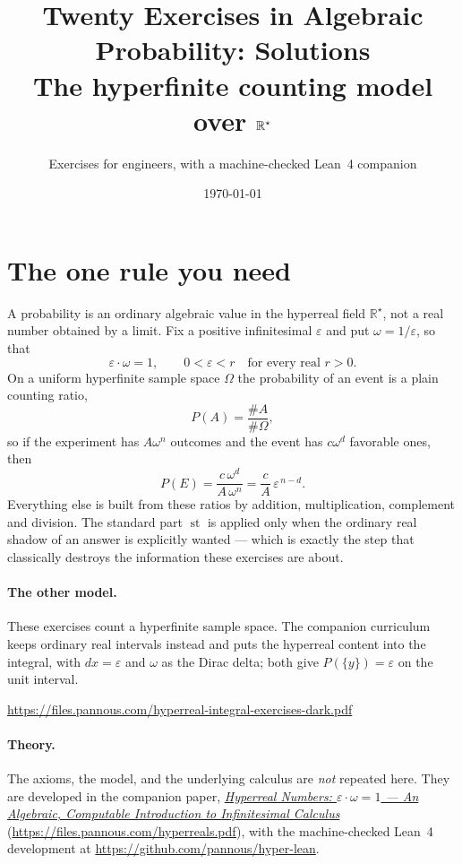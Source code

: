 \documentclass[11pt]{article}
\title{Twenty Exercises in Algebraic Probability: Solutions\\
\large The hyperfinite counting model over $\Rstar$}
\author{Exercises for engineers, with a machine-checked Lean~4 companion}
\date{\today}
\newcommand{\Rstar}{\mathbb{R}^{\star}}
\newcommand{\eps}{\varepsilon}
\newcommand{\st}{\operatorname{st}}
\begin{document}
\maketitle


\section*{The one rule you need}

A probability is an ordinary algebraic value in the hyperreal field $\Rstar$,
not a real number obtained by a limit. Fix a positive infinitesimal $\eps$ and
put $\omega = 1/\eps$, so that
\[
  \eps \cdot \omega = 1,
  \qquad 0 < \eps < r \quad\text{for every real } r > 0 .
\]
On a uniform hyperfinite sample space $\Omega$ the probability of an event is a
plain counting ratio,
\[
  P(A) = \frac{\#A}{\#\Omega},
\]
so if the experiment has $A\omega^{n}$ outcomes and the event has $c\omega^{d}$
favorable ones, then
\[
  P(E) = \frac{c\,\omega^{d}}{A\,\omega^{n}} = \frac{c}{A}\,\eps^{\,n-d}.
\]
Everything else is built from these ratios by addition, multiplication,
complement and division. The standard part $\st$ is applied only when the
ordinary real shadow of an answer is explicitly wanted --- which is exactly the
step that classically destroys the information these exercises are about.

\paragraph{The other model.} These exercises count a hyperfinite sample space.
The companion curriculum keeps ordinary real intervals instead and puts the
hyperreal content into the integral, with $dx=\eps$ and $\omega$ as the Dirac
delta; both give $P(\{y\})=\eps$ on the unit interval.
\begin{center}\small\url{https://files.pannous.com/hyperreal-integral-exercises-dark.pdf}\end{center}

\paragraph{Theory.} The axioms, the model, and the underlying calculus are
\emph{not} repeated here. They are developed in the companion paper,
\href{https://files.pannous.com/hyperreals.pdf}{\emph{Hyperreal Numbers: $\eps\cdot\omega=1$ --- An
Algebraic, Computable Introduction to Infinitesimal Calculus}}
(\url{https://files.pannous.com/hyperreals.pdf}), with the machine-checked Lean~4 development at
\url{https://github.com/pannous/hyper-lean}.
\end{document}

